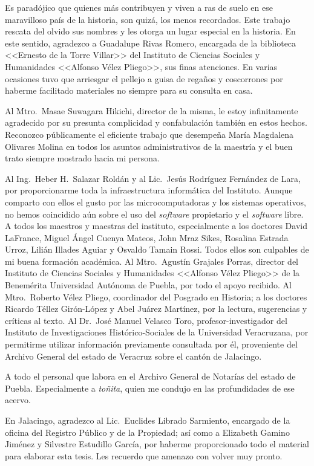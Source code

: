 \documentclass[14pt,twoside,final]{extbook} %
\begin{document}
Es paradójico que quienes más contribuyen y viven a ras de suelo en ese maravilloso país de la historia, son quizá, los menos recordados. Este trabajo rescata del olvido sus nombres y les otorga un lugar especial en la historia. En este sentido, agradezco a Guadalupe Rivas Romero, encargada de la biblioteca <<Ernesto de la Torre Villar>> del Instituto de Ciencias Sociales y Humanidades <<Alfonso Vélez Pliego>>, sus finas atenciones. En varias ocasiones tuvo que arriesgar el pellejo a guisa de regaños y coscorrones por haberme facilitado materiales no siempre para su consulta en casa.

Al Mtro.~Masae Suwagara Hikichi, director de la misma, le estoy infinitamente agradecido por su presunta complicidad y confabulación también en estos hechos. Reconozco públicamente el eficiente trabajo que desempeña María Magdalena Olivares Molina en todos los asuntos administrativos de la maestría y el buen trato siempre mostrado hacia mi persona.

Al Ing.~Heber H.~Salazar Roldán y al Lic.~Jesús Rodríguez Fernández de Lara, por proporcionarme toda la infraestructura informática del Instituto. Aunque comparto con ellos el gusto por las microcomputadoras y los sistemas operativos, no hemos coincidido aún sobre el uso del \emph{software} propietario y el \emph{software} libre. A todos los maestros y maestras del instituto, especialmente a los doctores David LaFrance, Miguel Ángel Cuenya Mateos, John Mraz Sikes, Rosalina Estrada Urroz, Lilián Illades Aguiar y Osvaldo Tamain Rossi. Todos ellos son culpables de mi buena formación académica. Al Mtro.~Agustín Grajales Porras, director del Instituto de Ciencias Sociales y Humanidades <<Alfonso Vélez Pliego>> de la Benemérita Universidad Autónoma de Puebla, por todo el apoyo recibido. Al Mtro.~Roberto Vélez Pliego, coordinador del Posgrado en Historia; a los doctores Ricardo Téllez Girón-López y Abel Juárez Martínez, por la lectura, sugerencias y críticas al texto. Al Dr.~José Manuel Velasco Toro, profesor-investigador del Instituto de Investigaciones Histórico-Sociales de la Universidad Veracruzana, por permitirme utilizar información previamente consultada por él, proveniente del Archivo General del estado de Veracruz sobre el cantón de Jalacingo.

A todo el personal que labora en el Archivo General de Notarías del estado de Puebla. Especialmente a \emph{toñita}, quien me condujo en las profundidades de ese acervo.

En Jalacingo, agradezco al Lic.~Euclides Librado Sarmiento, encargado de la oficina del Registro Público y de la Propiedad; así como a Elizabeth Gamino Jiménez y Silvestre Estudillo García, por haberme proporcionado todo el material para elaborar esta tesis. Les recuerdo que amenazo con volver muy pronto.
\end{document}
